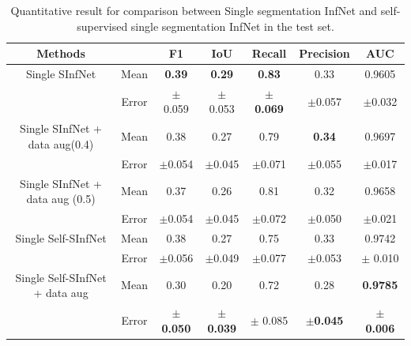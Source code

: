 \begin{table}[!h]
	\centering
	\begin{tabular}{| c | c || c c c c c ||}
		\hline
		Methods & & F1 & IoU & Recall & Precision & AUC \\ \hline
		Single SInfNet &  Mean & \textbf{0.39} & \textbf{0.29} & \textbf{0.83} & 0.33 & 0.9605 \\ \cline{2-7}
		& Error & $\pm$ 0.059 & $\pm$ 0.053 & $\pm$ \textbf{0.069} & $\pm$0.057  & $\pm$0.032 \\ \hline
		Single SInfNet + data aug(0.4) &  Mean & 0.38 & 0.27 & 0.79 & \textbf{0.34} & 0.9697 \\ \cline{2-7}
		& Error & $\pm$0.054  & $\pm$0.045  &$\pm$0.071 &$\pm$0.055 &$\pm$0.017 \\ \hline
		Single SInfNet + data aug (0.5) &  Mean & 0.37 & 0.26 & 0.81 & 0.32 & 0.9658 \\ \cline{2-7}
		& Error &$\pm$0.054 &$\pm$0.045 &$\pm$0.072 &$\pm$0.050 &  $\pm$0.021  \\ \hline \hline
		Single Self-SInfNet &  Mean & 0.38 & 0.27 & 0.75 & 0.33 & 0.9742  \\ \cline{2-7}
		& Error & $\pm$0.056 & $\pm$0.049 &$\pm$0.077  & $\pm$0.053 & $\pm$  0.010 \\ \hline
		Single Self-SInfNet + data aug &  Mean & 0.30 & 0.20 & 0.72 & 0.28 &  \textbf{0.9785} \\ \cline{2-7}
		& Error & $\pm$ \textbf{0.050}  & $\pm$  \textbf{0.039} & $\pm$ 0.085 & $\pm$\textbf{0.045} & $\pm$ \textbf{0.006}  \\ \hline
	\end{tabular}
	\caption{Quantitative result for comparison between Single segmentation InfNet and self-supervised single segmentation InfNet in the test set.}
	\label{tab:single}
\end{table}

